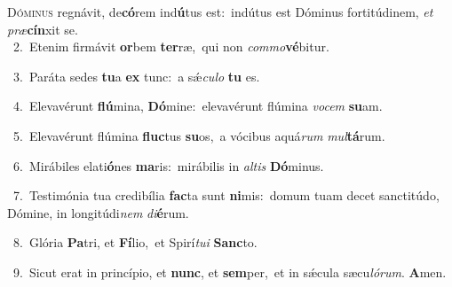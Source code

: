 \lettrine{\initial\textcolor{\initialcolor}{D}}{óminus} regnávit, de\-\textbf{có}\-rem ind\-\textbf{ú}\-tus est:~\star indútus est Dóminus fortitúdinem, \textit{et} \textit{præ}\-\textbf{cín}xit se.\\
{\numbfont\textcolor{\numbcolor}{~2.}}~Etenim firmávit \textbf{or}\-bem \textbf{ter}\-ræ,~\star qui non \textit{com}\-\textit{mo}\textbf{vé}bitur.\par
{\numbfont\textcolor{\numbcolor}{~3.}}~Paráta sedes \textbf{tu}\-a \textbf{ex} tunc:~\star a sǽ\-\textit{cu}\-\textit{lo} \textbf{tu} es.\par
{\numbfont\textcolor{\numbcolor}{~4.}}~Elevavérunt \textbf{flú}\-mina, \textbf{Dó}\-mine:~\star elevavérunt flúmina \textit{vo}\-\textit{cem} \textbf{su}\-am.\par
{\numbfont\textcolor{\numbcolor}{~5.}}~Elevavérunt flúmina \textbf{fluc}\-tus \textbf{su}\-os,~\star a vócibus aquá\textit{rum} \textit{mul}\-\textbf{tá}rum.\par
{\numbfont\textcolor{\numbcolor}{~6.}}~Mirábiles elati\-\textbf{ó}\-nes \textbf{ma}\-ris:~\star mirábilis in \textit{al}\-\textit{tis} \textbf{Dó}\-minus.\par
{\numbfont\textcolor{\numbcolor}{~7.}}~Testimónia tua credibília \textbf{fac}\-ta sunt \textbf{ni}\-mis:~\star domum tuam decet sanctitúdo, Dómine, in longitúdi\textit{nem} \textit{di}\-\textbf{é}rum.\par
{\numbfont\textcolor{\numbcolor}{~8.}}~Glória \textbf{Pa}\-tri, et \textbf{Fí}\-lio,~\star et Spirí\-\textit{tu}\-\textit{i} \textbf{Sanc}\-to.\par
{\numbfont\textcolor{\numbcolor}{~9.}}~Sicut erat in princípio, et \textbf{nunc}\-, et \textbf{sem}\-per,~\star et in sǽcula sæcu\-\textit{ló}\-\textit{rum}. \textbf{A}\-men.\par
